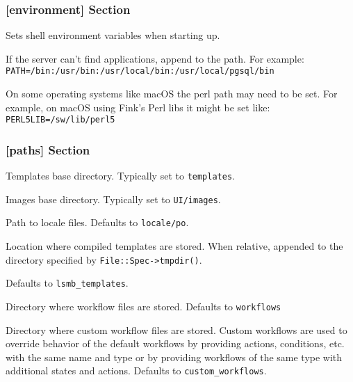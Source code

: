 \subsubsection{[environment] Section}
\label{subsubsec-global-config-ledgersmb-conf-environment}

        Sets shell environment variables when starting up.

\begin{description}[style=nextline]
        \item[PATH] If the server can't find applications, append to the path. For example:
        \texttt{PATH=/bin:/usr/bin:/usr/local/bin:/usr/local/pgsql/bin}
        \item [PERL5LIB] On some operating systems like macOS the perl path may need to be set. For example, on macOS using Fink's Perl libs it might be set like:
        \texttt{PERL5LIB=/sw/lib/perl5}
\end{description}


\subsubsection{[paths] Section}
\label{subsubsec-global-config-ledgersmb-conf-paths}

\begin{description}[style=nextline]
        \item [templates] Templates base directory. Typically set to \texttt{templates}.
        \item [images] Images base directory. Typically set to \texttt{UI/images}.
        \item [localepath] Path to locale files. Defaults to \texttt{locale/po}.
        \item [templates\_cache] Location where compiled templates are stored. When relative, appended to the directory specified by \texttt{File::Spec->tmpdir()}. 
        
        Defaults to \texttt{lsmb\_templates}.
        \item [workflows] Directory where workflow files are stored. Defaults to \texttt{workflows}
        \item [custom\_workflows] Directory where custom workflow files are stored. Custom workflows are used to override behavior of the default workflows by providing actions, conditions, etc. with the same name and type or by providing workflows of the same type with additional states and actions. Defaults to \texttt{custom\_workflows}.
        
\end{description}

